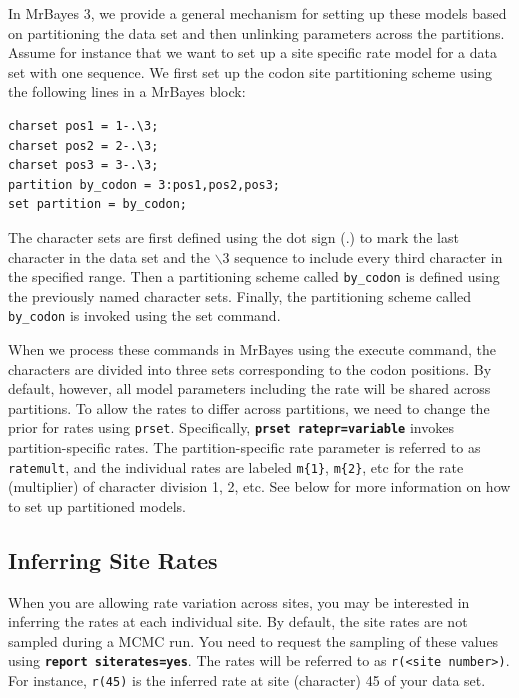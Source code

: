 \documentclass[12pt]{book}
\newcommand{\ttt}[1]{\texttt{#1}}
\newcommand{\tb}[1]{\ttt{\textbf{#1}}}
\begin{document}
In MrBayes 3, we provide a general mechanism for setting up these models based on partitioning the
data set and then unlinking parameters across the partitions. Assume for instance that we want to
set up a site specific rate model for a data set with one sequence. We first set up the codon site
partitioning scheme using the following lines in a MrBayes block:

\begin{singlespacing}
\footnotesize
\begin{verbatim}
charset pos1 = 1-.\3;
charset pos2 = 2-.\3;
charset pos3 = 3-.\3;
partition by_codon = 3:pos1,pos2,pos3;
set partition = by_codon;
\end{verbatim}
\normalsize
\end{singlespacing}

The character sets are first defined using the dot sign (.) to mark the last character in the data
set and the $\backslash$3 sequence to include every third character in the specified range. Then a
partitioning scheme called \ttt{by\_codon} is defined using the previously named character sets.
Finally, the partitioning scheme called \ttt{by\_codon} is invoked using the set command.

When we process these commands in MrBayes using the execute command, the characters are divided
into three sets corresponding to the codon positions. By default, however, all model parameters
including the rate will be shared across partitions. To allow the rates to differ across
partitions, we need to change the prior for rates using \ttt{prset}. Specifically, \tb{prset
ratepr=variable} invokes partition-specific rates. The partition-specific rate parameter is
referred to as \ttt{ratemult}, and the individual rates are labeled \ttt{m\{1\}}, \ttt{m\{2\}}, etc
for the rate (multiplier) of character division 1, 2, etc. See below for more information on how to
set up partitioned models.

\subsection{Inferring Site Rates}
When you are allowing rate variation across sites, you may be interested in inferring the rates at
each individual site. By default, the site rates are not sampled during a MCMC run. You need to
request the sampling of these values using \tb{report siterates=yes}. The rates will be referred to
as \ttt{r(<site number>)}. For instance, \ttt{r(45)} is the inferred rate at site (character) 45 of
your data set.
\end{document}
